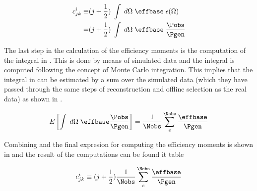 \begin{center}
\begin{align}
   c^i_{jk}  \equiv &(j + \frac{1}{2}) \; \int \; d\Omega \; \effbase \; \epsilon(\Omega) \nonumber \\ 
                 = &(j + \frac{1}{2}) \; \int \; d\Omega \; \effbase \; \frac{\Pobs}{\Pgen}
  \label{eff_moms_def}
\end{align}
\end{center}

\noindent The last step in the calculation of the efficiency moments is the computation of the integral in .
This is done by means of simulated data and the integral is computed following the concept of Monte Carlo integration. This implies
that the integral in  can be estimated by a sum over the simulated data (which they have passed through the same 
steps of reconstruction and offline selection as the real data) as shown in .   

\begin{center}
\begin{equation}
  E\left[ \int \; d\Omega \; \effbase \frac{\Pobs}{\Pgen} \right] = \frac{1}{\Nobs} \sum_e^{\Nobs} \frac{\effbase}{\Pgen}  
  \label{eff_moms_calc}
\end{equation}
\end{center}

\noindent Combining  and  the final expresion for computing the efficiency moments is shown
in  and the result of the computations can be found it table   

\begin{center}
\begin{equation}
 c^i_{jk} \equiv (j + \frac{1}{2})  \frac{1}{\Nobs} \sum_e^{\Nobs} \frac{\effbase}{\Pgen}  
  \label{eff_moms_calc_final}
\end{equation}
\end{center}

